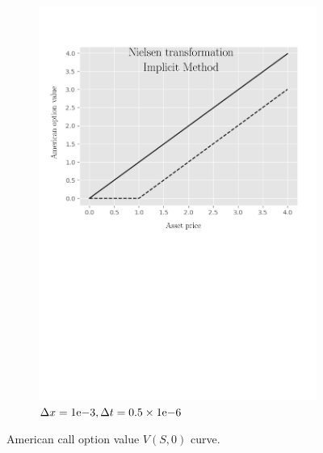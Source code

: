 \begin{figure}[tbp]
\begin{subfigure}{0.4\textwidth}
    \includegraphics[width=\textwidth]{chapters/chapter3/TestCase1ImplicitNielsen.pdf}
    \caption{$\Delta{x}={1}\mathrm{e}{-3}, \Delta{t}=0.5\times{1}\mathrm{e}{-6}$}
    \label{fig:finitedifferencesschemes:numericaresults:test_case_1_implicit_nielsen}
  \end{subfigure}
  \caption{American call option value $V(S, 0)$ curve.}
  \label{fig:finitedifferencesschemes:numericaresults:test_case_1_explicit}
\end{figure}

